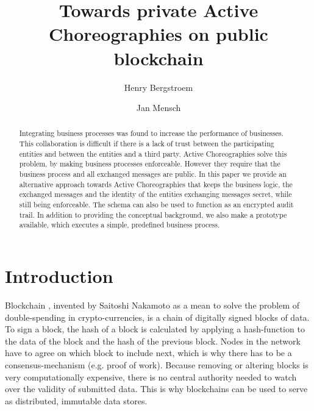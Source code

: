 \documentclass[runningheads]{llncs}
\begin{document}
%
\title{Towards private Active Choreographies on public blockchain}
%
%
\author{Henry Bergstroem \and
Jan Mensch}
%
%


%
\maketitle              %
%
\begin{abstract}


Integrating business processes was found to increase the performance of businesses. This collaboration is difficult if there is a lack of trust between the participating entities and between the entities and a third party. Active Choreographies solve this problem, by making business processes enforceable. However they require that the business process and all exchanged messages are public. In this paper we provide an alternative approach towards Active Choreographies that keeps the business logic, the exchanged messages and the identity of the entities exchanging messages secret, while still being enforceable. The schema can also be used to function as an encrypted audit trail. In addition to providing the conceptual background, we also make a prototype available, which executes a simple, predefined business process.


\end{abstract}



\section{Introduction} \label{intro}

Blockchain \cite{nakamoto2008bitcoin}, invented by Saitoshi Nakamoto as a mean to solve the problem of double-spending in crypto-currencies, is a chain of digitally signed blocks of data. To sign a block, the hash of a block is calculated by applying a hash-function to the data of the block and the hash of the previous block. Nodes in the network have to agree on which block to include next, which is why there has to be a consensus-mechanism (e.g. proof of work). Because removing or altering blocks is very computationally expensive, there is no central authority needed to watch over the validity of submitted data. This is why blockchains can be used to serve as distributed, immutable data stores.
\end{document}
